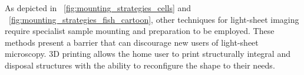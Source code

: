 As depicted in \figurename~\ref{fig:mounting_strategies_cells} and \figurename~\ref{fig:mounting_strategies_fish_cartoon}, other techniques for light-sheet imaging require specialist sample mounting and preparation to be employed.
These methods present a barrier that can discourage new users of light-sheet microscopy.
3D printing allows the home user to print structurally integral and disposal structures with the ability to reconfigure the shape to their needs.
